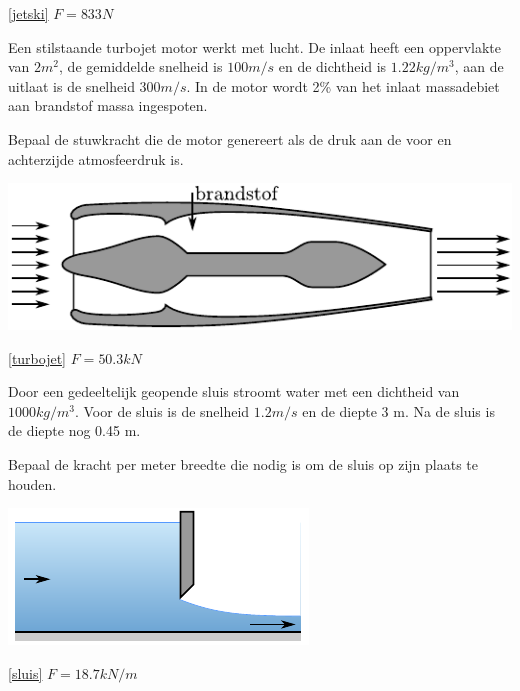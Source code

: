 \begin{antwoord}{\ref{jetski}}
	$F = 833\unit{N}$
\end{antwoord}
\begin{toepassing}
	\label{turbojet}
Een stilstaande turbojet motor werkt met lucht. De inlaat heeft een oppervlakte van $2\unit{m^2}$, de gemiddelde snelheid is $100\unit{m/s}$ en de dichtheid is $1.22\unit{kg/m^3}$, aan de uitlaat is de snelheid $300\unit{m/s}$. In de motor wordt 2\% van het inlaat massadebiet aan brandstof massa ingespoten.

Bepaal de stuwkracht die de motor genereert als de druk aan de voor en achterzijde atmosfeerdruk is.

	\centering
	\includegraphics{fig/behoudsvergelijkingen/turbojet}
\end{toepassing}
\begin{antwoord}{\ref{turbojet}}
	$F = 50.3\unit{kN}$
\end{antwoord}
\begin{toepassing}
	\label{sluis}
Door een gedeeltelijk geopende sluis stroomt water met een dichtheid van $1000\unit{kg/m^3}$. Voor de sluis is de snelheid $1.2\unit{m/s}$ en de diepte 3 m. Na de sluis is de diepte nog 0.45 m.

Bepaal de kracht per meter breedte die nodig is om de sluis op zijn plaats te houden.

	\centering
	\includegraphics{fig/behoudsvergelijkingen/sluis}
\end{toepassing}
\begin{antwoord}{\ref{sluis}}
	$F = 18.7\unit{kN/m}$
\end{antwoord}
